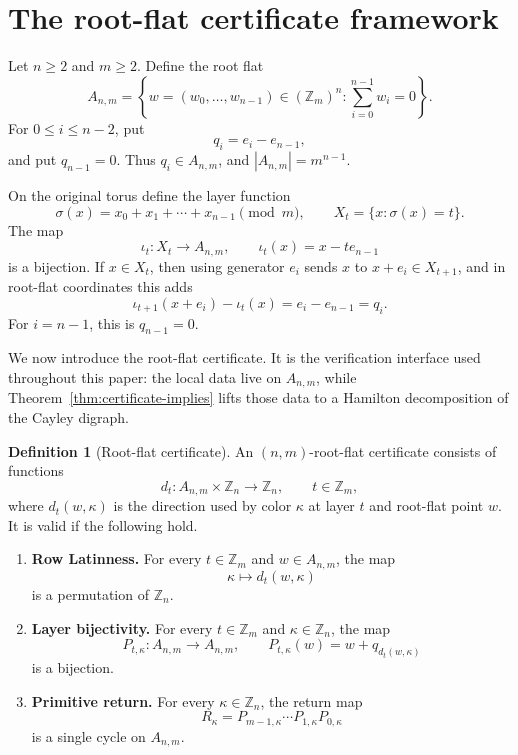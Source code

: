 \documentclass[11pt]{article}
\theoremstyle{definition}
\newtheorem{definition}{Definition}
\begin{document}
\section{The root-flat certificate framework}\label{sec:root-flat-framework}

Let \(n\ge2\) and \(m\ge2\).  Define the root flat
\[
A_{n,m}=\left\{w=(w_0,\ldots,w_{n-1})\in(\mathbb Z_m)^n:\sum_{i=0}^{n-1}w_i=0\right\}.
\]
For \(0\le i\le n-2\), put
\[
q_i=e_i-e_{n-1},
\]
and put \(q_{n-1}=0\).  Thus \(q_i\in A_{n,m}\), and \(|A_{n,m}|=m^{n-1}\).

On the original torus define the layer function
\[
\sigma(x)=x_0+x_1+\cdots+x_{n-1}\pmod m,
\qquad X_t=\{x:\sigma(x)=t\}.
\]
The map
\[
\iota_t:X_t\longrightarrow A_{n,m},\qquad \iota_t(x)=x-t e_{n-1}
\]
is a bijection.  If \(x\in X_t\), then using generator \(e_i\) sends \(x\) to \(x+e_i\in X_{t+1}\),
and in root-flat coordinates this adds
\[
\iota_{t+1}(x+e_i)-\iota_t(x)=e_i-e_{n-1}=q_i.
\]
For \(i=n-1\), this is \(q_{n-1}=0\).

We now introduce the root-flat certificate.  It is the verification interface used throughout this paper: the local data live on \(A_{n,m}\), while Theorem~\ref{thm:certificate-implies} lifts those data to a Hamilton decomposition of the Cayley digraph.

\begin{definition}[Root-flat certificate]\label{def:root-flat-certificate}
An \((n,m)\)-root-flat certificate consists of functions
\[
d_t:A_{n,m}\times\mathbb Z_n\longrightarrow\mathbb Z_n,
\qquad t\in\mathbb Z_m,
\]
where \(d_t(w,\kappa)\) is the direction used by color \(\kappa\) at layer \(t\) and root-flat point
\(w\).  It is valid if the following hold.
\begin{enumerate}[label=(RF\arabic*)]
\item \textbf{Row Latinness.}  For every \(t\in\mathbb Z_m\) and \(w\in A_{n,m}\), the map
\[
\kappa\longmapsto d_t(w,\kappa)
\]
is a permutation of \(\mathbb Z_n\).
\item \textbf{Layer bijectivity.}  For every \(t\in\mathbb Z_m\) and \(\kappa\in\mathbb Z_n\), the map
\[
P_{t,\kappa}:A_{n,m}\to A_{n,m},
\qquad P_{t,\kappa}(w)=w+q_{d_t(w,\kappa)}
\]
is a bijection.
\item \textbf{Primitive return.}  For every \(\kappa\in\mathbb Z_n\), the return map
\[
R_\kappa=P_{m-1,\kappa}\cdots P_{1,\kappa}P_{0,\kappa}
\]
is a single cycle on \(A_{n,m}\).
\end{enumerate}
\end{definition}
\end{document}
